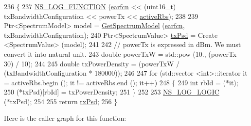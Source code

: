 \begin{DoxyCode}
236 \{
237   \hyperlink{log-macros-disabled_8h_a90b90d5bad1f39cb1b64923ea94c0761}{NS\_LOG\_FUNCTION} (\hyperlink{generate__test__data__lte__spectrum__model_8m_a584be7562abb392609629331f8c6c42c}{earfcn} << (uint16\_t) txBandwidthConfiguration << powerTx << 
      \hyperlink{generate__test__data__lte__spectrum__value__txpsd_8m_a24a77723355dffcf07f2679649d46828}{activeRbs});
238 
239   Ptr<SpectrumModel> model = \hyperlink{classns3_1_1LteSpectrumValueHelper_a8b8e37e31ac9bcf4e3fa2d69ad931e0e}{GetSpectrumModel} (\hyperlink{generate__test__data__lte__spectrum__model_8m_a584be7562abb392609629331f8c6c42c}{earfcn}, txBandwidthConfiguration);
240   Ptr<SpectrumValue> \hyperlink{lte__link__budget_8m_a684fe3101a5e48a5fcc57cab8dbcd1aa}{txPsd} = Create <SpectrumValue> (model);
241 
242   \textcolor{comment}{// powerTx is expressed in dBm. We must convert it into natural unit.}
243   \textcolor{keywordtype}{double} powerTxW = std::pow (10., (powerTx - 30) / 10);
244 
245   \textcolor{keywordtype}{double} txPowerDensity = (powerTxW / (txBandwidthConfiguration * 180000));
246 
247   \textcolor{keywordflow}{for} (std::vector <int>::iterator it = \hyperlink{generate__test__data__lte__spectrum__value__txpsd_8m_a24a77723355dffcf07f2679649d46828}{activeRbs}.begin (); it != 
      \hyperlink{generate__test__data__lte__spectrum__value__txpsd_8m_a24a77723355dffcf07f2679649d46828}{activeRbs}.end (); it++)
248     \{
249       \textcolor{keywordtype}{int} rbId = (*it);
250       (*txPsd)[rbId] = txPowerDensity;
251     \}
252 
253   \hyperlink{group__logging_ga88acd260151caf2db9c0fc84997f45ce}{NS\_LOG\_LOGIC} (*txPsd);
254 
255   \textcolor{keywordflow}{return} \hyperlink{lte__link__budget_8m_a684fe3101a5e48a5fcc57cab8dbcd1aa}{txPsd};
256 \}
\end{DoxyCode}


Here is the caller graph for this function\+:


